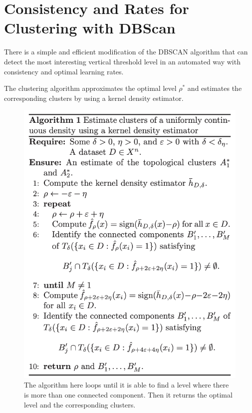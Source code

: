 \section{Consistency and Rates for Clustering with DBScan}

There is a simple and efficient modification of the DBSCAN algorithm that can detect the most interesting vertical threshold level in an automated way with consistency and optimal learning rates.

The clustering algorithm approximates the optimal level $\rho^*$ and estimates the corresponding clusters by using a kernel density estimator. 

\begin{figure}[H]
    \centering
    \includegraphics{chapter_2/files/consistency_dbscan.png}
    \caption{The algorithm here loops until it is able to find a level where there is more than one connected component. Then it returns the optimal level and the corresponding clusters.}
    \label{fig:consistency_dbscan}
\end{figure}


